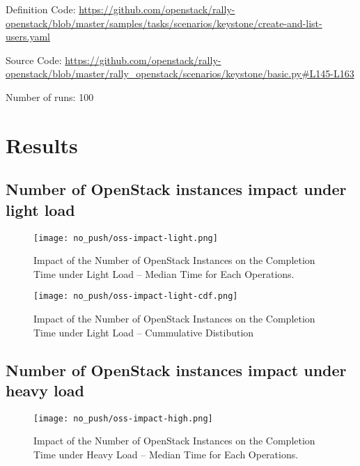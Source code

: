 Definition Code: \url{https://github.com/openstack/rally-openstack/blob/master/samples/tasks/scenarios/keystone/create-and-list-users.yaml}

Source Code: \url{https://github.com/openstack/rally-openstack/blob/master/rally\_openstack/scenarios/keystone/basic.py#L145-L163}

Number of runs: 100

\section{Results}
\label{results}

\subsection{Number of OpenStack instances impact under light load}
\begin{figure}[H]
  \vspace{-10pt}
  \centering
  \centerline{\texttt{[image: no\_push/oss-impact-light.png]}}
  \vspace{-5pt}
  \caption{Impact of the Number of OpenStack Instances on the Completion Time under Light Load – Median Time for Each Operations.}
  \vspace{-5pt}
  \label{fig:oss-impact-light}
\end{figure}


\begin{figure}[H]
  \vspace{-10pt}
  \centering
  \centerline{\texttt{[image: no\_push/oss-impact-light-cdf.png]}}
  \vspace{-5pt}
  \caption{Impact of the Number of OpenStack Instances on the Completion Time under Light Load – Cummulative Distibution}
  \vspace{-5pt}
  \label{fig:oss-impact-light-cdf}
\end{figure}

\subsection{Number of OpenStack instances impact under heavy load}
\begin{figure}[H]
  \vspace{-10pt}
  \centering
  \centerline{\texttt{[image: no\_push/oss-impact-high.png]}}
  \vspace{-5pt}
  \caption{Impact of the Number of OpenStack Instances on the Completion Time under Heavy Load – Median Time for Each Operations.}
  \vspace{-5pt}
  \label{fig:oss-impact-high}
\end{figure}


